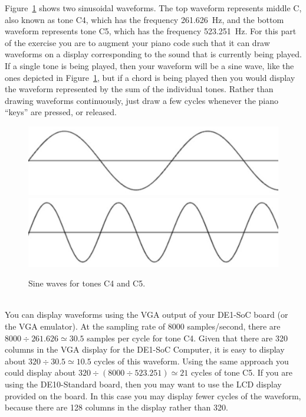 \documentclass[epsfig,10pt,fullpage]{article}
\begin{document}
\noindent
Figure~\ref{fig:sinewaves} shows two sinusoidal waveforms. The top waveform represents
middle C, also known as tone C4, which has the frequency 261.626~Hz, and the bottom
waveform represents tone C5, which has the frequency 523.251~Hz. For this part of the
exercise you are to augment your piano code such that it can draw waveforms on a 
display corresponding to the sound that is currently being played. If a single tone is
being played, then your waveform will be a sine wave, like the ones depicted in
Figure~\ref{fig:sinewaves}, but if a chord is being played then
you would display the waveform represented by the sum of the individual tones.
Rather than drawing waveforms continuously, just draw a few cycles whenever the piano
``keys'' are pressed, or released. 

\begin{figure}[H]
   \begin{center}
			  \includegraphics[scale=0.67]{figures/middleC.pdf}
			  \includegraphics[scale=0.67]{figures/nextC.pdf}
   \end{center}
   \caption{Sine waves for tones C4 and C5.}
	\label{fig:sinewaves}
\end{figure}

~\\
\noindent
You can display waveforms using the VGA output of your DE1-SoC board (or the VGA emulator).
At the sampling rate 
of 8000 samples/second, there are $8000 \div 261.626 \simeq 30.5$ samples per cycle for 
tone C4. Given that there are 320 columns in the VGA display for the DE1-SoC Computer, it 
is easy to display about $320 \div 30.5 \simeq 10.5$ cycles of this waveform. Using the same 
approach you could display about $320 \div (8000 \div 523.251) \simeq 21$ cycles of tone C5.
If you are using the DE10-Standard board, then you may want to use the LCD display
provided on the board. In this case you may display fewer cycles of the waveform, because 
there are 128 columns in the display rather than 320.
\end{document}
